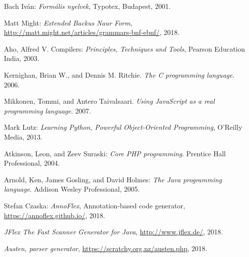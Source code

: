 \begin{thebibliography}{x}

Bach Iván: \emph{Formális nyelvek}, Typotex, Budapest, 2001.

Matt Might: \emph{Extended Backus Naur Form}, \url{http://matt.might.net/articles/grammars-bnf-ebnf/}, 2018.

Aho, Alfred V. Compilers: \emph{Principles, Techniques and Tools}, Pearson Education India, 2003.

Kernighan, Brian W., and Dennis M. Ritchie. \emph{The C programming language}. 2006.

Mikkonen, Tommi, and Antero Taivalsaari. \emph{Using JavaScript as a real programming language}. 2007.

Mark Lutz: \emph{Learning Python, Powerful Object-Oriented Programming}, O'Reilly Media, 2013.

Atkinson, Leon, and Zeev Suraski: \emph{Core PHP programming}. Prentice Hall Professional, 2004.

Arnold, Ken, James Gosling, and David Holmes: \emph{The Java programming language}. Addison Wesley Professional, 2005.

Stefan Czaska: \emph{AnnoFlex}, Annotation-based code generator,
\url{https://annoflex.github.io/}, 2018.

\emph{JFlex The Fast Scanner Generator for Java},
\url{http://www.jflex.de/}, 2018.

\emph{Austen, parser generator},
\url{https://scratchy.org.nz/austen.php}, 2018.

\end{thebibliography}

